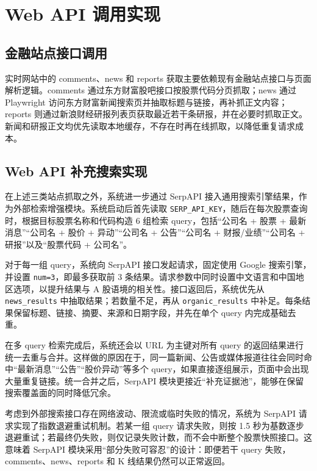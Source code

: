 \section{Web API 调用实现}

\subsection{金融站点接口调用}

实时网站中的 comments、news 和 reports 获取主要依赖现有金融站点接口与页面解析逻辑。comments 通过东方财富股吧接口按股票代码分页抓取；news 通过 Playwright 访问东方财富新闻搜索页并抽取标题与链接，再补抓正文内容；reports 则通过新浪财经研报列表页获取最近若干条研报，并在必要时抓取正文。新闻和研报正文均优先读取本地缓存，不存在时再在线抓取，以降低重复请求成本。

\subsection{Web API 补充搜索实现}

在上述三类站点抓取之外，系统进一步通过 SerpAPI 接入通用搜索引擎结果，作为外部检索增强模块。系统启动后首先读取 \texttt{SERP\_API\_KEY}，随后在每次股票查询时，根据目标股票名称和代码构造 6 组检索 query，包括“公司名 + 股票 + 最新消息”“公司名 + 股价 + 异动”“公司名 + 公告”“公司名 + 财报/业绩”“公司名 + 研报”以及“股票代码 + 公司名”。

对于每一组 query，系统向 SerpAPI 接口发起请求，固定使用 Google 搜索引擎，并设置 \texttt{num=3}，即最多获取前 3 条结果。请求参数中同时设置中文语言和中国地区选项，以提升结果与 A 股语境的相关性。接口返回后，系统优先从 \texttt{news\_results} 中抽取结果；若数量不足，再从 \texttt{organic\_results} 中补足。每条结果保留标题、链接、摘要、来源和日期字段，并先在单个 query 内完成基础去重。

在多 query 检索完成后，系统还会以 URL 为主键对所有 query 的返回结果进行统一去重与合并。这样做的原因在于，同一篇新闻、公告或媒体报道往往会同时命中“最新消息”“公告”“股价异动”等多个 query，如果直接逐组展示，页面中会出现大量重复链接。统一合并之后，SerpAPI 模块更接近“补充证据池”，能够在保留搜索覆盖面的同时降低冗余。

考虑到外部搜索接口存在网络波动、限流或临时失败的情况，系统为 SerpAPI 请求实现了指数退避重试机制。若某一组 query 请求失败，则按 1.5 秒为基数逐步退避重试；若最终仍失败，则仅记录失败计数，而不会中断整个股票快照接口。这意味着 SerpAPI 模块采用“部分失败可容忍”的设计：即便若干 query 失败，comments、news、reports 和 K 线结果仍然可以正常返回。

